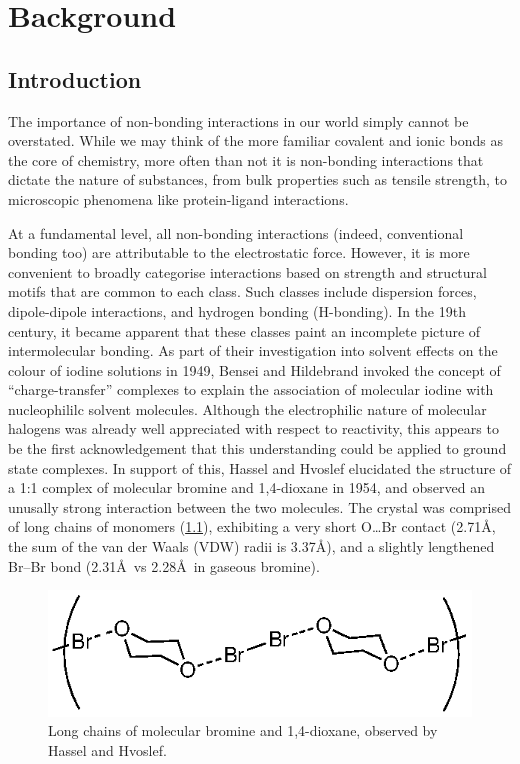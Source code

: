 \part{Background}
\begin{refsection}

\chapter{Introduction}

The importance of non-bonding interactions in our world simply cannot be overstated.
While we may think of the more familiar covalent and ionic bonds as the core of chemistry, more often than not it is non-bonding interactions that dictate the nature of substances, from bulk properties such as tensile strength, to microscopic phenomena like protein-ligand interactions.

At a fundamental level, all non-bonding interactions (indeed, conventional bonding too) are attributable to the electrostatic force.
However, it is more convenient to broadly categorise interactions based on strength and structural motifs that are common to each class.
Such classes include dispersion forces, dipole-dipole interactions, and hydrogen bonding (H-bonding).
In the 19th century, it became apparent that these classes paint an incomplete picture of intermolecular bonding.
As part of their investigation into solvent effects on the colour of iodine solutions in 1949, Bensei and Hildebrand invoked the concept of ``charge-transfer'' complexes to explain the association of molecular iodine with nucleophililc solvent molecules.\autocite{Benesi1949}
Although the electrophilic nature of molecular halogens was already well appreciated with respect to reactivity, this appears to be the first acknowledgement that this understanding could be applied to ground state complexes.
In support of this, Hassel and Hvoslef elucidated the structure of a 1:1 complex of molecular bromine and 1,4-dioxane in 1954, and observed an unusally strong interaction between the two molecules.\autocite{Hassel1954}
The crystal was comprised of long chains of monomers (\cref{fig:hassel-xray}), exhibiting a very short O\dots Br contact (2.71\AA, the sum of the van der Waals (VDW) radii is 3.37\AA), and a slightly lengthened Br--Br bond (2.31\AA~vs 2.28\AA~in gaseous bromine).

\begin{figure}[ht]
  \includegraphics[width=0.6\columnwidth]{Figures/hassel-xray.eps}
  \caption[Bromine-dioxane complex.]{Long chains of molecular bromine and 1,4-dioxane, observed by Hassel and Hvoslef.}
  \label{fig:hassel-xray}
\end{figure}


\end{refsection}
